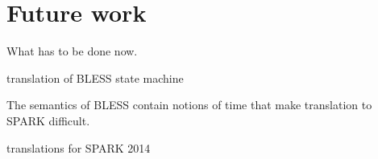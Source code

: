 
\cleardoublepage


\chapter{Future work}
\label{future_work}

What has to be done now.

translation of BLESS state machine

The semantics of BLESS contain notions of time that make translation to SPARK difficult.

translations for SPARK 2014